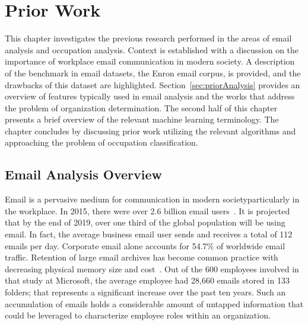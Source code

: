 \documentclass[12pt]{report}
\begin{document}
\chapter{Prior Work} \label{PriorWork}
This chapter investigates the previous research performed in the areas of email analysis and occupation analysis.
Context is established with a discussion on the importance of workplace email communication in modern society.
A description of the benchmark in email datasets, the Enron email corpus, is provided, and the drawbacks of this dataset are highlighted.
Section~\ref{sec:priorAnalysis} provides an overview of features typically used in email analysis and the works that address the problem of organization determination.
The second half of this chapter presents a brief overview of the relevant machine learning terminology.
The chapter concludes by discussing prior work utilizing the relevant algorithms and approaching the problem of occupation classification.


\section{Email Analysis Overview}
Email is a pervasive medium for communication in modern society\textemdash{}particularly in the workplace.
In 2015, there were over 2.6 billion email users~\cite{radicati_emails_2015}.
It is projected that by the end of 2019, over one third of the global population will be using email.
In fact, the average business email user sends and receives a total of 112 emails per day.
Corporate email alone accounts for 54.7\% of worldwide email traffic.
Retention of large email archives has become common practice with decreasing physical memory size and cost~\cite{fisher_revisiting_2006}.
Out of the 600 employees involved in that study at Microsoft, the average employee had 28,660 emails stored in 133 folders; that represents a significant increase over the past ten years.
Such an accumulation of emails holds a considerable amount of untapped information that could be leveraged to characterize employee roles within an organization.
\end{document}
